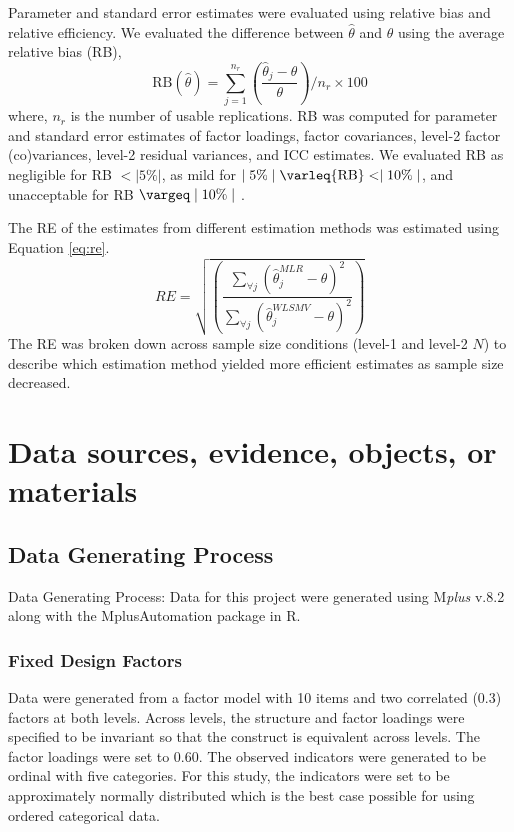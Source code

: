 \documentclass[man, noextraspace, 12pt]{apa7}
\renewcommand{\leq}{\varleq}
\renewcommand{\geq}{\vargeq}
\begin{document}
Parameter and standard error estimates were evaluated using relative bias and relative efficiency. 
We evaluated the difference between $\hat{\theta}$ and $\theta$ using the average relative bias (RB),
\begin{equation}
\mathrm{RB}(\hat{\theta}) = \sum_{j=1}^{n_r}\left(\frac{\hat{\theta}_j- \theta}{\theta}\right)/n_r\times 100
\end{equation}
where, $n_r$ is the number of usable replications.
RB was computed for parameter and standard error estimates of factor loadings, factor covariances, level-2 factor (co)variances, level-2 residual variances, and ICC estimates.
We evaluated RB as negligible for RB $< | 5\% |$, as mild for $\mid 5\%\mid \leq {\rm RB} < \mid 10\%\mid$, and unacceptable for RB $\geq \mid 10\%\mid$ \citep{Hoogland1998}.

The RE of the estimates from different estimation methods was estimated using Equation \ref{eq:re}.
\begin{equation}\label{eq:re}
RE = \sqrt{\left( \frac{\sum_{\forall j}\left(\hat{\theta}_j^{MLR} -\theta\right)^2 }{\sum_{\forall j}\left(\hat{\theta}_j^{WLSMV} -\theta\right)^2 }\right)}
\end{equation}
The RE was broken down across sample size conditions (level-1 and level-2 $N$) to describe which estimation method yielded more efficient estimates as sample size decreased.

\section{Data sources, evidence, objects, or materials}

\subsection{Data Generating Process}

Data Generating Process: Data for this project were generated using M\textit{plus} v.8.2 \citep{Muthen2017} along with the MplusAutomation \citep{Hallquist2018} package in R. %

\subsubsection{Fixed Design Factors}

Data were generated from a factor model with 10 items and two correlated (0.3) factors at both levels.
Across levels, the structure and factor loadings were specified to be invariant so that the construct is equivalent across levels.
The factor loadings were set to 0.60.
The observed indicators were generated to be ordinal with five categories.
For this study, the indicators were set to be approximately normally distributed which is the best case possible for using ordered categorical data.
\end{document}
